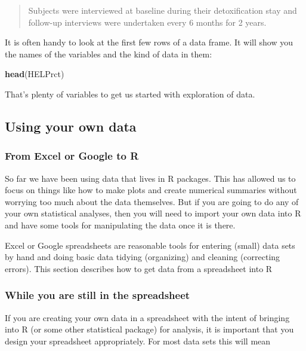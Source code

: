\documentclass[]{book}
\newenvironment{Shaded}{\begin{snugshade}}{\end{snugshade}}
\newcommand{\KeywordTok}[1]{\textcolor[rgb]{0.13,0.29,0.53}{\textbf{#1}}}
\newcommand{\NormalTok}[1]{#1}
\begin{document}
\begin{quote}
Subjects were interviewed at baseline during their detoxification stay and
follow-up interviews were undertaken every 6 months for 2 years.
\end{quote}

It is often handy to look at the first few rows of a data frame. It will show you the names of the variables and the kind of data in them:

\begin{Shaded}
\begin{Highlighting}[]
\KeywordTok{head}\NormalTok{(HELPrct)}
\end{Highlighting}
\end{Shaded}

That's plenty of variables to get us started with exploration of data.

\hypertarget{using-your-own-data}{%
\subsection{Using your own data}\label{using-your-own-data}}

\hypertarget{from-excel-or-google-to-r}{%
\subsubsection{From Excel or Google to R}\label{from-excel-or-google-to-r}}

So far we have been using data that lives in R packages. This has allowed us
to focus on things like how to make plots and create numerical summaries
without worrying too much about the data themselves. But if you are going to
do any of your own statistical analyses, then you will need to import your own
data into R and have some tools for manipulating the data once it is there.

Excel or Google spreadsheets are reasonable tools for entering (small) data
sets by hand and doing basic data tidying (organizing) and cleaning (correcting
errors). This section describes how to get data from a spreadsheet into R

\hypertarget{while-you-are-still-in-the-spreadsheet}{%
\subsubsection{While you are still in the spreadsheet}\label{while-you-are-still-in-the-spreadsheet}}

If you are creating your own data in a spreadsheet with the intent of bringing
into R (or some other statistical package) for analysis, it is important that
you design your spreadsheet appropriately. For most data sets this will mean
\end{document}
